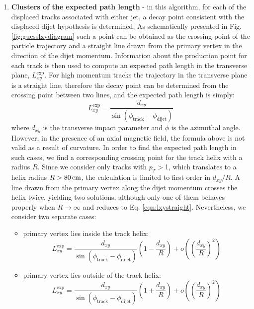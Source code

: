 \begin{enumerate}
\item{\bf Clusters of the expected path length}  
\label{subsec:Clusters}
- in this algorithm, for each of the displaced tracks associated with either jet, a decay point consistent 
with the displaced dijet hypothesis 
is determined. As schematically presented in Fig. 
\ref{fig:guesslxydiagram} such a point 
 can be obtained as the crossing point of   
the particle trajectory and a straight line drawn from the primary vertex in the direction of the dijet momentum.  
Information about the production point for each track is then used to compute an expected path length in the
transverse plane, $L_{xy}^\text{exp}$.  
For high momentum tracks the trajectory in the transverse plane is a straight line,
 therefore the decay point can be determined from the crossing point between two lines,
 and the expected path length is simply:
\begin{equation}
 L_{xy}^\text{exp}=\frac{d_{xy}}{\sin(\phi_\text{track} - \phi_\text{dijet})}
\label{eqn:lxystraight}
\end{equation}
where $d_{xy}$ is the transverse impact parameter and $\phi$ is the azimuthal angle. However, 
in the presence of an axial magnetic field, the formula above is not valid as a result of
curvature. In order to find the expected path length in such cases,
 we find a corresponding crossing point for the track helix with a radius $R$. Since we consider only
tracks with $p_T>$1\GeV, which translates to a helix radius $R>80\,\text{cm}$, 
the calculation is limited to first order in 
$d_{xy}/R$. 
 A line drawn from the primary vertex along the dijet momentum crosses the helix twice, yielding
 two solutions, although only one of them behaves properly when $R \to \infty$ 
and reduces to Eq. \ref{eqn:lxystraight}. Nevertheless, we consider two  
separate cases:
\begin{itemize}
 \item primary vertex lies inside the track helix:
\begin{equation}
 L_{xy}^\text{exp} = \frac{d_{xy}}{\sin\left(\phi_\text{track} - \phi_\text{dijet}\right)} \left(1 - \frac{d_{xy}}{R}\right) + o\left(\left(\frac{d_{xy}}{R}\right)^2\right)
\end{equation} 
 \item primary vertex lies outside of the track helix:
\begin{equation}
 L_{xy}^\text{exp} = \frac{d_{xy}}{\sin\left(\phi_\text{track} - \phi_\text{dijet}\right)} \left(1 + \frac{d_{xy}}{R}\right) + o\left(\left(\frac{d_{xy}}{R}\right)^2\right)
\end{equation} 

\end{itemize}
\end{enumerate}
